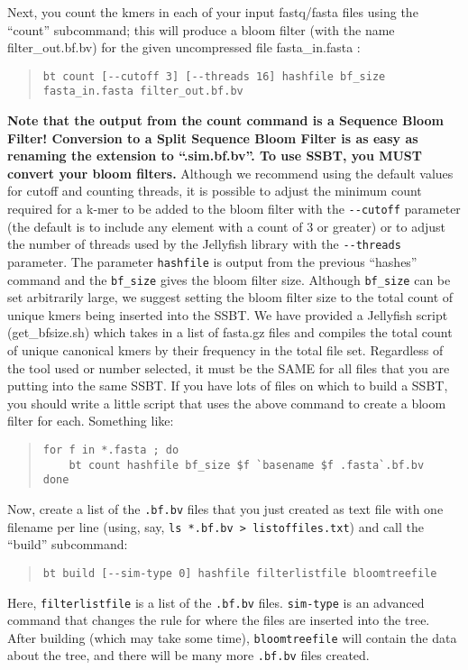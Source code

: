 \documentclass{article}
\begin{document}
Next, you count the kmers in each of your input fastq/fasta files using the ``count'' subcommand; this will produce a bloom filter (with the name filter\_out.bf.bv) for the given uncompressed file fasta\_in.fasta :
%
\begin{quote}
\begin{verbatim}
bt count [--cutoff 3] [--threads 16] hashfile bf_size fasta_in.fasta filter_out.bf.bv
\end{verbatim}
\end{quote}
%
\textbf{Note that the output from the count command is a Sequence Bloom Filter! Conversion to a Split Sequence Bloom Filter is as easy as renaming the extension to ``.sim.bf.bv''. To use SSBT, you MUST convert your bloom filters.} Although we recommend using the default values for cutoff and counting threads, it is possible to adjust the minimum count required for a k-mer to be added to the bloom filter with the \verb+--cutoff+ parameter (the default is to include any element with a count of 3 or greater) or to adjust the number of threads used by the Jellyfish library with the \verb+--threads+ parameter. The parameter \verb+hashfile+ is output from the previous ``hashes'' command and the \verb+bf_size+ gives the bloom filter size. Although \verb+bf_size+ can be set arbitrarily large, we suggest setting the bloom filter size to the total count of unique kmers being inserted into the SSBT. We have provided a Jellyfish script (get\_bfsize.sh) which takes in a list of fasta.gz files and compiles the total count of unique canonical kmers by their frequency in the total file set. Regardless of the tool used or number selected, it must be the SAME for all files that you are putting into the same SSBT. If you have lots of files on which to build a SSBT, you should write a little script that uses the above command to create a bloom filter for each. Something like:
%
\begin{quote}
\begin{verbatim}
for f in *.fasta ; do 
    bt count hashfile bf_size $f `basename $f .fasta`.bf.bv
done
\end{verbatim}
\end{quote}

Now, create a list of the \verb+.bf.bv+ files that you just created as text file with one filename per line (using, say, \verb+ls *.bf.bv > listoffiles.txt+) and call the ``build'' subcommand:
\begin{quote}
\begin{verbatim}
bt build [--sim-type 0] hashfile filterlistfile bloomtreefile
\end{verbatim}
\end{quote}
Here, \verb+filterlistfile+ is a list of the \verb+.bf.bv+ files. \verb+sim-type+ is an advanced command that changes the rule for where the files are inserted into the tree. After building (which may take some time), \verb+bloomtreefile+ will contain the data about the tree, and there will be many more \verb+.bf.bv+ files created. 
\end{document}
